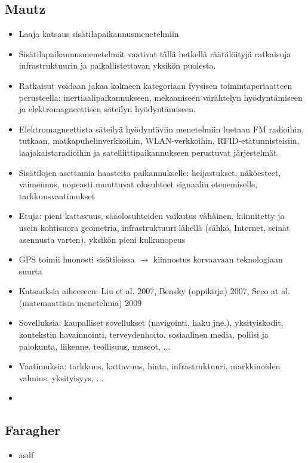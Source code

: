 \documentclass[a4paper]{scrartcl}
\begin{document}
\subsection{Mautz\cite{mautz2012indoor}}
\begin{itemize}
	\item Laaja katsaus sisätilapaikannusmenetelmiin
	\item Sisätilapaikannusmenetelmät vaativat tällä hetkellä räätälöityjä
		ratkaisuja infrastruktuurin ja paikallistettavan yksikön puolesta.
	\item Ratkaisut voidaan jakaa kolmeen kategoriaan fyysisen
		toimintaperiaatteen perusteella: inertiaalipaikannukseen, mekaaniseen
		värähtelyn hyödyntämiseen ja elektromagneettisen säteilyn hyödyntämiseen.
	\item Elektromagneettista säteilyä hyödyntäviin menetelmiin luetaan
		FM radioihin, tutkaan, matkapuhelinverkkoihin, WLAN-verkkoihin,
		RFID-etätunnisteisiin, laajakaistaradioihin ja satelliittipaikannukseen
		perustuvat järjestelmät.
	\item Sisätilojen asettamia haasteita paikannukselle: heijastukset,
		näköesteet, vaimennus, nopeasti muuttuvat olosuhteet signaalin etenemiselle,
		tarkkuusvaatimukset
	\item Etuja: pieni kattavuus, sääolosuhteiden vaikutus vähäinen, kiinnitetty
		ja usein kohtisuora geometria, infrastruktuuri lähellä (sähkö, Internet,
		seinät asennusta varten), yksikön pieni kulkunopeus
	\item GPS toimii huonosti sisätiloissa $\rightarrow$ kiinnostus
		korvaavaan teknologiaan suurta
	\item Katsauksia aiheeseen: Liu et al. 2007, Bensky (oppikirja) 2007,
		Seco at al. (matemaattisia menetelmiä) 2009
	\item Sovelluksia: kaupalliset sovellukset (navigointi, haku jne.),
		yksityiskodit, kontekstin havainnointi, terveydenhoito, sosiaalinen media,
    poliisi ja palokunta, liikenne, teollisuus, museot, $\dots$
  \item Vaatimuksia: tarkkuus, kattavuus, hinta, infrastruktuuri,
    markkinoiden valmius, yksityisyys, $\ldots$
  \item
\end{itemize}


\subsection{Faragher\cite{faragher2012opportunistic}}
\begin{itemize}
  \item asdf
\end{itemize}
\end{document}
